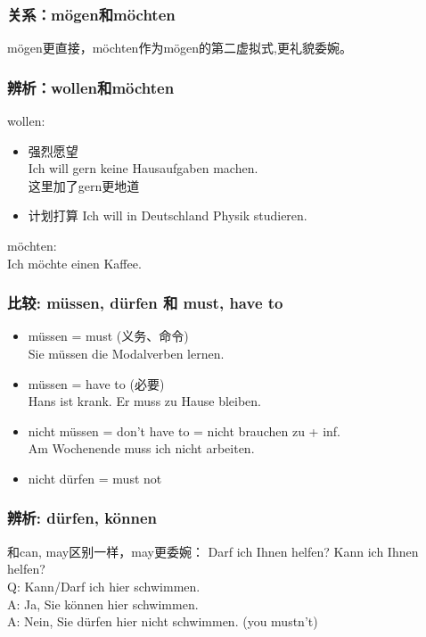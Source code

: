 \subsubsection{关系：mögen和möchten}
mögen更直接，möchten作为mögen的第二虚拟式,更礼貌委婉。
\subsubsection{辨析：wollen和möchten}
wollen:
\begin{itemize}
    \item 强烈愿望\\
          Ich will gern keine Hausaufgaben machen. \\
          这里加了gern更地道
    \item 计划打算
          Ich will in Deutschland Physik studieren. \\
\end{itemize}
möchten: \\
Ich möchte einen Kaffee. \\
\subsubsection{比较: müssen, dürfen 和 must, have to}
\begin{itemize}
    \item müssen = must (义务、命令) \\
          Sie müssen die Modalverben lernen.
    \item müssen = have to (必要) \\
          Hans ist krank. Er muss zu Hause bleiben.
    \item nicht müssen = don't have to  = nicht brauchen zu + inf. \\
          Am Wochenende muss ich nicht arbeiten.
    \item nicht dürfen = must not
\end{itemize}

\subsubsection{辨析: dürfen, können}
和can, may区别一样，may更委婉：
Darf ich Ihnen helfen? Kann ich Ihnen helfen? \\
Q: Kann/Darf ich hier schwimmen. \\
A: Ja, Sie können hier schwimmen. \\
A: Nein, Sie dürfen hier nicht schwimmen. (you mustn't) \\

